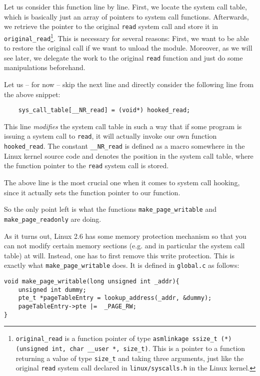 \documentclass[10pt, letterpaper]{article}
\begin{document}
Let us consider this function line by line. First, we locate the system call table, which is basically just an array of pointers to system call functions. Afterwards, we retrieve the pointer to the original \texttt{read} system call and store it in  \texttt{original\_read}\footnote{\texttt{original\_read} is a function pointer of type \texttt{asmlinkage ssize\_t (*)(unsigned int, char \_\_user *, size\_t)}. This is a pointer to a function returning a value of type \texttt{size\_t} and taking three arguments, just like the original \texttt{read} system call declared in \texttt{linux/syscalls.h} in the Linux kernel.}. This is necessary for several reasons: First, we want to be able to restore the original call if we want to unload the module. Moreover, as we will see later, we delegate the work to the original \texttt{read} function and just do some manipulations beforehand.

Let us -- for now -- skip the next line and directly consider the following line from the above snippet:

\begin{verbatim}
    sys_call_table[__NR_read] = (void*) hooked_read;
\end{verbatim}

This line \emph{modifies} the system call table in such a way that if some program is issuing a system call to \texttt{read}, it will actually invoke our own function \texttt{hooked\_read}. The constant \texttt{\_\_NR\_read} is defined as a macro somewhere in the Linux kernel source code and denotes the position in the system call table, where the function pointer to the \texttt{read} system call is stored.

The above line is the most crucial one when it comes to system call hooking, since it actually sets the function pointer to our function.

So the only point left is what the functions \texttt{make\_page\_writable} and \texttt{make\_page\_readonly} are doing.

As it turns out, Linux 2.6 has some memory protection mechanism so that you can not modify certain memory sections (e.g. and in particular the system call table) at will. Instead, one has to first remove this write protection. This is exactly what \texttt{make\_page\_writable} does. It is defined in \texttt{global.c} as follows:

\begin{verbatim}
void make_page_writable(long unsigned int _addr){
    unsigned int dummy;
    pte_t *pageTableEntry = lookup_address(_addr, &dummy);
    pageTableEntry->pte |=  _PAGE_RW;
}
\end{verbatim}
\end{document}
